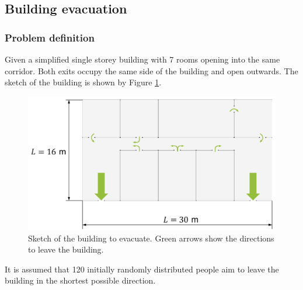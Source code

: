 \documentclass[a4paper,12pt,openany]{book}
\theoremstyle{break}
\begin{document}
\subsection{Building evacuation} \label{sec:SFM_example}
\subsubsection{Problem definition}
Given a simplified single storey building with 7 rooms opening into the same corridor. Both exits occupy the same side of the building and open outwards. The sketch of the building is shown by Figure \ref{fig:building_sketch}.
\begin{figure}[H]
  \includegraphics[scale=0.5]{building_sketch.pdf}
  \centering
  \caption{Sketch of the building to evacuate. Green arrows show the directions to leave the building.}
  \label{fig:building_sketch}
\end{figure}\vspace*{3pt}
It is assumed that 120 initially randomly distributed people aim to leave the building in the shortest possible direction.
\end{document}
